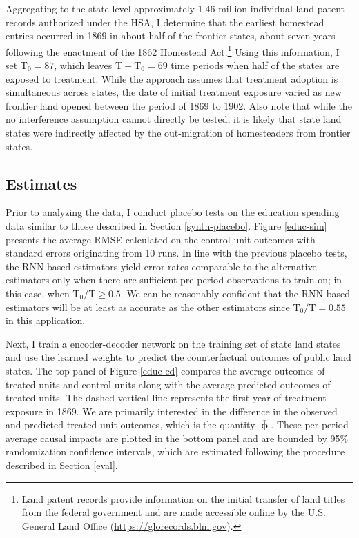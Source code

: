 \documentclass[hidelinks,12pt]{article}
\begin{document}
Aggregating to the state level approximately 1.46 million individual land patent records authorized under the HSA, I determine that the earliest homestead entries occurred in 1869 in about half of the frontier states, about seven years following the enactment of the 1862 Homestead Act.\footnote{Land patent records provide information on the initial transfer of land titles from the federal government and are made accessible online by the U.S. General Land Office (\url{https://glorecords.blm.gov}).} Using this information, I set $\text{T}_0 = 87$, which leaves $\text{T} - \text{T}_0 = 69$ time periods when half of the states are exposed to treatment. While the approach assumes that treatment adoption is simultaneous across states, the date of initial treatment exposure varied as new frontier land opened between the period of 1869 to 1902. Also note that while the no interference assumption cannot directly be tested, it is likely that state land states were indirectly affected by the out-migration of homesteaders from frontier states. 

\subsection{Estimates}

Prior to analyzing the data, I conduct placebo tests on the education spending data similar to those described in Section \ref{synth-placebo}. Figure \ref{educ-sim} presents the average RMSE calculated on the control unit outcomes with standard errors originating from 10 runs. In line with the previous placebo tests, the RNN-based estimators yield error rates comparable to the alternative estimators only when there are sufficient pre-period observations to train on; in this case, when $\text{T}_0/\text{T} \geq 0.5$. We can be reasonably confident that the RNN-based estimators will be at least as accurate as the other estimators since $\text{T}_0/\text{T} = 0.55$ in this application. 

Next, I train a encoder-decoder network on the training set of state land states and use the learned weights to predict the counterfactual outcomes of public land states. The top panel of Figure \ref{educ-ed} compares the average outcomes of treated units and control units along with the average predicted outcomes of treated units. The dashed vertical line represents the first year of treatment exposure in 1869. We are primarily interested in the difference in the observed and predicted treated unit outcomes, which is the quantity $\boldsymbol{\bar{\upphi}}$. These per-period average causal impacts are plotted in the bottom panel and are bounded by 95\% randomization confidence intervals, which are estimated following the procedure described in Section \ref{eval}. 
\end{document}
